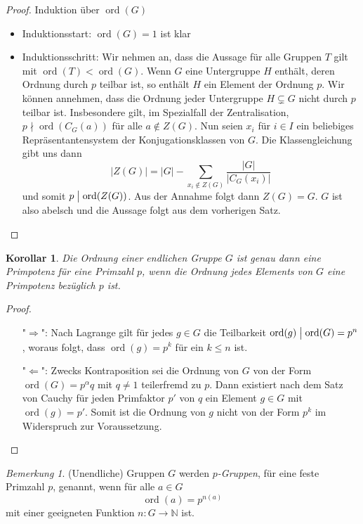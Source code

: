 \documentclass[12pt]{scrartcl} %
\DeclareMathOperator{\ord}{ord}
\newcommand{\divides}{\mathrel{\bigm|}}
\newcommand\N{\mathbb{N}}
\newtheorem{kor}[thm]{Korollar}
\theoremstyle{definition}
\theoremstyle{remark}
\newtheorem*{nb}{Bemerkung}
\newcommand{\defi}{\emph}
\begin{document}
\begin{proof}
	Induktion über $\ord(G)$
	\begin{itemize}
	\item Induktionsstart: $\ord(G)=1$ ist klar
	\item Induktionsschritt: Wir nehmen an, dass die Aussage für alle Gruppen \(T\) gilt mit $\ord(T)<\ord(G)$.
		Wenn \(G\) eine Untergruppe \(H\) enthält, deren Ordnung durch \(p\) teilbar ist, so enthält \(H\) ein Element der Ordnung \(p\).
		Wir können annehmen, dass die Ordnung jeder Untergruppe $H \subsetneq G$ nicht durch \(p\) teilbar ist.
		Insbesondere gilt, im Spezialfall der Zentralisation, $p \nmid \ord(C_{G}(a))$ für alle $a \notin Z(G)$.
		Nun seien \(x_i\) für \(i \in I\) ein beliebiges Repräsentantensystem der Konjugationsklassen von \(G\).
		Die Klassengleichung gibt uns dann \[|Z(G)| = |G| - \sum_{x_i \notin Z(G)}\dfrac{|G|}{|C_{G}(x_i)|}\] und somit $p \divides \ord(Z(G))$.
		Aus der Annahme folgt dann \(Z(G)=G\).
		\(G\) ist also abelsch und die Aussage folgt aus dem vorherigen Satz.\qedhere
\end{itemize}
\end{proof}

\begin{kor}
	Die Ordnung einer endlichen Gruppe \(G\) ist genau dann eine Primpotenz für eine Primzahl \(p\), wenn die Ordnung jedes Elements von \(G\) eine Primpotenz bezüglich \(p\) ist.
\end{kor}

\begin{proof}
	\begin{itemize}
	\item["$\Rightarrow$":] Nach Lagrange gilt für jedes \(g\in G\) die Teilbarkeit \(\ord(g) \divides \ord(G)=p^n\), woraus folgt, dass $\ord(g)=p^k$ für ein \(k \leq n\) ist.
	\item["$\Leftarrow$":] Zwecks Kontraposition sei die Ordnung von \(G\) von der Form $\ord(G)=p^\alpha q$ mit $q\neq 1$ teilerfremd zu \(p\).
		Dann existiert nach dem Satz von Cauchy für jeden Primfaktor $p'$ von \(q\) ein Element $g \in G$ mit \(\ord(g)=p'\). Somit ist die Ordnung von $g$ nicht von der Form $p^k$ im Widerspruch zur Voraussetzung.
	\end{itemize}
\end{proof}

\begin{nb}
	(Unendliche) Gruppen \(G\) werden \defi{\(p\)-Gruppen}, für eine feste Primzahl \(p\), genannt, wenn für alle \(a \in G\) \[\ord(a)=p^{n(a)}\] mit einer geeigneten Funktion \(n: G \to \N\) ist.
\end{nb}
\end{document}
